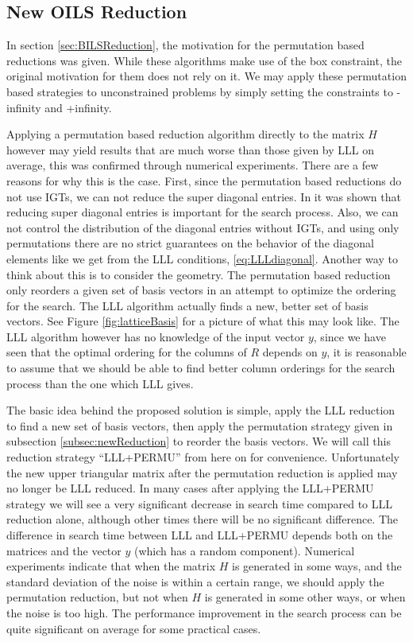 \documentclass[12pt,Bold,letterpaper]{mcgilletdclass}
\newcommand{\vsp}{\vspace{\baselineskip}}
\begin{document}
\vsp \subsection{New OILS Reduction} \label{subsec:newOILS}
In section \ref{sec:BILSReduction}, the motivation for the permutation based reductions was given. While these algorithms make use of the box constraint, the original motivation for them does not rely on it. We may apply these permutation based strategies to unconstrained problems by simply setting the constraints to -infinity and +infinity.

Applying a permutation based reduction algorithm directly to the matrix $H$ however may yield results that are much worse than those given by LLL on average, this was confirmed through numerical experiments. There are a few reasons for why this is the case. First, since the permutation based reductions do not use IGTs, we can not reduce the super diagonal entries. In \cite{XieCB11} it was shown that reducing super diagonal entries is important for the search process. Also, we can not control the distribution of the diagonal entries without IGTs, and using only permutations there are no strict guarantees on the behavior of the diagonal elements like we get from the LLL conditions, \eqref{eq:LLLdiagonal}. Another way to think about this is to consider the geometry. The permutation based reduction only reorders a given set of basis vectors in an attempt to optimize the ordering for the search. The LLL algorithm actually finds a new, better set of basis vectors. See Figure \ref{fig:latticeBasis} for a picture of what this may look like. The LLL algorithm however has no knowledge of the input vector $y$, since we have seen that the optimal ordering for the columns of $R$ depends on $y$, it is reasonable to assume that we should be able to find better column orderings for the search process than the one which LLL gives.

The basic idea behind the proposed solution is simple, apply the LLL reduction to find a new set of basis vectors, then apply the permutation strategy given in subsection \ref{subsec:newReduction} to reorder the basis vectors. We will call this reduction strategy ``LLL+PERMU'' from here on for convenience. Unfortunately the new upper triangular matrix after the permutation reduction is applied may no longer be LLL reduced. In many cases after applying the LLL+PERMU strategy we will see a very significant decrease in search time compared to LLL reduction alone, although other times there will be no significant difference. The difference in search time between LLL and LLL+PERMU depends both on the matrices and the vector $y$ (which has a
random component). Numerical experiments indicate that when the matrix $H$ is
generated in some ways, and the standard deviation of the noise is within a
certain range, we should apply the permutation reduction, but not when $H$ is generated
in some other ways, or when the noise is too high. The performance improvement
in the search process can be quite significant on average for some practical
cases.
\end{document}
